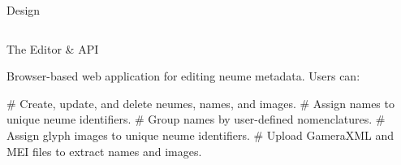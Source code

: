 \documentclass[final]{beamer}
\newlength{\onecolwid}
\newcommand{\blockSpace}{\vskip 0.75ex}
\begin{document}
\begin{frame}[fragile,t]
\begin{columns}
\begin{column}{\onecolwid}
\begin{block}{Design}


\end{block}



\end{column}

\end{columns}

\vspace{-1cm}

\begin{columns}
\begin{column}{\onecolwid}
\begin{block}{The Editor \& API}
\raggedright
Browser-based web application for editing neume metadata.  Users can:
\begin{easylist}[itemize]
# Create, update, and delete neumes, names, and images.
# Assign names to unique neume identifiers.
# Group names by user-defined nomenclatures.
# Assign glyph images to unique neume identifiers.
# Upload GameraXML and MEI files to extract names and images.
\end{easylist}


\end{block}
\end{column}
\end{columns}
\end{frame}
\end{document}
